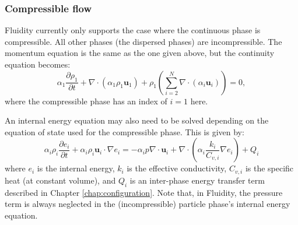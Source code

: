 \subsubsection{Compressible flow}
Fluidity currently only supports the case where the continuous phase is compressible. All other phases (the dispersed phases) are incompressible. The momentum equation is the same as the one given above, but the continuity equation becomes:
\begin{equation}
\alpha_1\frac{\partial\rho_1}{\partial t} + \nabla\cdot\left(\alpha_1\rho_1\mathbf{u}_1\right) + \rho_1\left(\sum_{i=2}^N\nabla\cdot\left(\alpha_i\mathbf{u}_i\right)\right) = 0,
\end{equation}
where the compressible phase has an index of $i=1$ here.

An internal energy equation may also need to be solved depending on the equation of state used for the compressible phase. This is given by:
\begin{equation}
\alpha_i\rho_i\frac{\partial e_i}{\partial t} + \alpha_i\rho_i\mathbf{u}_i\cdot\nabla e_i = -\alpha_i p\nabla\cdot\mathbf{u}_i + \nabla\cdot\left(\alpha_i\frac{k_i}{C_{v,i}}\nabla e_i\right) + Q_i
\end{equation}
where $e_i$ is the internal energy, $k_i$ is the effective conductivity, $C_{v,i}$ is the specific heat (at constant volume), and $Q_i$ is an inter-phase energy transfer term described in Chapter \ref{chap:configuration}. Note that, in Fluidity, the pressure term is always neglected in the (incompressible) particle phase's internal energy equation.
